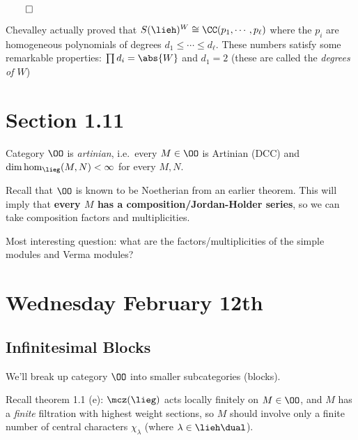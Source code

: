 \(\qed\)

\begin{description}
\tightlist
\item[Remark]
Chevalley actually proved that
\(S(\lieh)^W \cong \CC(p_1, \cdots, p_\ell)\) where the \(p_i\) are
homogeneous polynomials of degrees \(d_1 \leq \cdots \leq d_\ell\).
These numbers satisfy some remarkable properties:
\(\prod d_i = \abs{W}\) and \(d_1 = 2\) (these are called the
\emph{degrees of \(W\)})
\end{description}

\hypertarget{section-1.11}{%
\section{Section 1.11}\label{section-1.11}}

\begin{description}
\tightlist
\item[Theorem (Category O is Artinian)]
Category \(\OO\) is \emph{artinian}, i.e.~every \(M \in \OO\) is
Artinian (DCC) and \(\dim \hom_\lieg(M, N) < \infty\) for every
\(M, N\).
\end{description}

Recall that \(\OO\) is known to be Noetherian from an earlier theorem.
This will imply that \textbf{every \(M\) has a composition/Jordan-Holder
series}, so we can take composition factors and multiplicities.

Most interesting question: what are the factors/multiplicities of the
simple modules and Verma modules?

\hypertarget{wednesday-february-12th}{%
\section{Wednesday February 12th}\label{wednesday-february-12th}}

\hypertarget{infinitesimal-blocks}{%
\subsection{Infinitesimal Blocks}\label{infinitesimal-blocks}}

We'll break up category \(\OO\) into smaller subcategories (blocks).

Recall theorem 1.1 (e): \(\mcz(\lieg)\) acts locally finitely on
\(M\in \OO\), and \(M\) has a \emph{finite} filtration with highest
weight sections, so \(M\) should involve only a finite number of central
characters \(\chi_\lambda\) (where \(\lambda \in\lieh\dual\)).

